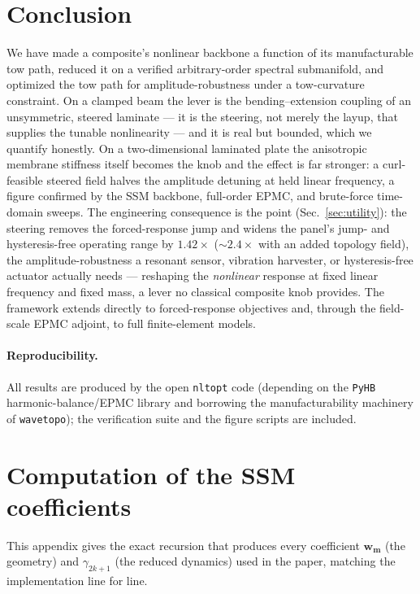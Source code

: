 \documentclass[11pt]{article}
\begin{document}
\section{Conclusion}
We have made a composite's nonlinear backbone a function of its manufacturable
tow path, reduced it on a verified arbitrary-order spectral submanifold, and
optimized the tow path for amplitude-robustness under a tow-curvature constraint.
On a clamped beam the lever is the bending--extension coupling of an unsymmetric,
steered laminate --- it is the steering, not merely the layup, that supplies the
tunable nonlinearity --- and it is real but bounded, which we quantify honestly.
On a two-dimensional laminated plate the anisotropic membrane stiffness itself
becomes the knob and the effect is far stronger: a curl-feasible steered field
halves the amplitude detuning at held linear frequency, a figure confirmed by the
SSM backbone, full-order EPMC, and brute-force time-domain sweeps. The engineering
consequence is the point (Sec.~\ref{sec:utility}): the steering removes the
forced-response jump and widens the panel's jump- and hysteresis-free operating
range by $1.42\times$ ($\sim\!2.4\times$ with an added topology field), the
amplitude-robustness a resonant sensor, vibration harvester, or hysteresis-free
actuator actually needs --- reshaping the \emph{nonlinear} response at fixed linear
frequency and fixed mass, a lever no classical composite knob provides. The
framework extends directly to forced-response objectives and, through the
field-scale EPMC adjoint, to full finite-element models.

\paragraph{Reproducibility.} All results are produced by the open
\texttt{nltopt} code (depending on the \texttt{PyHB} harmonic-balance/EPMC
library and borrowing the manufacturability machinery of \texttt{wavetopo});
the verification suite and the figure scripts are included.

\appendix
\section{Computation of the SSM coefficients}\label{app:coeffs}

This appendix gives the exact recursion that produces every coefficient
$\bm w_{\bm m}$ (the geometry) and $\gamma_{2k+1}$ (the reduced dynamics) used in
the paper, matching the implementation line for line.
\end{document}
